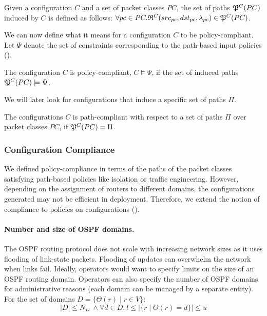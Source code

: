 \begin{definition}
Given a configuration $C$ and a set of packet classes $PC$, the set of paths
$\mathfrak{P}^C(PC)$ induced by $C$ is defined as follows: 
$\forall pc \in PC. \mathfrak{R}^C(src_{pc}, dst_{pc}, \lambda_{pc}) \in \mathfrak{P}^C(PC)$.
\end{definition}

\noindent We can now define what it means for a configuration $C$ to be policy-compliant. Let 
$\Psi$ denote the set of constraints corresponding to the 
path-based input policies (). 
\begin{definition}
	The configuration $C$ is policy-compliant,
	$C \models \Psi$, if the set of
	induced paths $\mathfrak{P}^C(PC) \models \Psi$.
\end{definition}

We will later look for configurations that induce a specific set of paths $\Pi$.  
\begin{definition}
	The configurations $C$ is path-compliant with respect to 
	a set of paths $\Pi$ over packet classes $PC$,
	if $\mathfrak{P}^C(PC)=\Pi$.
\end{definition}

\subsubsection{Configuration Compliance}
We defined policy-compliance in terms of the 
paths of the packet classes satisfying path-based 
policies like isolation or traffic engineering. However,
depending on the assignment of routers to different domains,
the configurations generated may not be efficient
in deployment. Therefore, we extend the notion of 
compliance to policies on configurations 
().

\paragraph{Number and size of OSPF domains.} 
The OSPF routing protocol does not scale 
with increasing network sizes
as it uses
flooding of link-state packets. Flooding 
of updates can  
overwhelm the network when links fail. 
Ideally, operators would want to specify
limits on the size of an OSPF routing domain. 
Operators can also specify the number of OSPF domains
for administrative reasons (each domain can be
managed by a separate entity). For the  
set of domains $D = \{\Theta(r) \mid r \in V\}$:
\begin{equation}
	|D| \leq N_{D} ~\wedge \forall d \in D. ~l \leq |\{r \mid \Theta(r) = d\}| \leq u
\end{equation}


